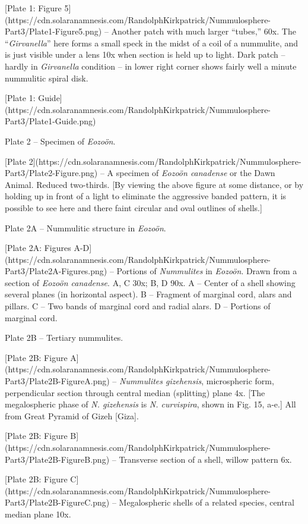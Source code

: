 \documentclass[a4paper, 12pt, oneside]{article}
\begin{document}
[Plate 1: Figure 5](https://cdn.solaranamnesis.com/RandolphKirkpatrick/Nummulosphere-Part3/Plate1-Figure5.png) -- Another patch with much larger ``tubes,'' 60x. The ``\emph{Girvanella}'' here forms a small speck in the midst of a coil of a nummulite, and is just visible under a lens 10x when section is held up to light. Dark patch -- hardly in \emph{Girvanella} condition -- in lower right corner shows fairly well a minute nummulitic spiral disk.

[Plate 1: Guide](https://cdn.solaranamnesis.com/RandolphKirkpatrick/Nummulosphere-Part3/Plate1-Guide.png)

Plate 2 -- Specimen of \emph{Eozoön}.

[Plate 2](https://cdn.solaranamnesis.com/RandolphKirkpatrick/Nummulosphere-Part3/Plate2-Figure.png) -- A specimen of \emph{Eozoön canadense} or the Dawn Animal. Reduced two-thirds. [By viewing the above figure at some distance, or by holding up in front of a light to eliminate the aggressive banded pattern, it is possible to see here and there faint circular and oval outlines of shells.]

Plate 2A -- Nummulitic structure in \emph{Eozoön}.

[Plate 2A: Figures A-D](https://cdn.solaranamnesis.com/RandolphKirkpatrick/Nummulosphere-Part3/Plate2A-Figures.png) -- Portions of \emph{Nummulites} in \emph{Eozoön}. Drawn from a section of \emph{Eozoön canadense}. A, C 30x; B, D 90x. A -- Center of a shell showing several planes (in horizontal aspect). B -- Fragment of marginal cord, alars and pillars. C -- Two bands of marginal cord and radial alars. D -- Portions of marginal cord.

Plate 2B -- Tertiary nummulites.

[Plate 2B: Figure A](https://cdn.solaranamnesis.com/RandolphKirkpatrick/Nummulosphere-Part3/Plate2B-FigureA.png) -- \emph{Nummulites gizehensis}, microspheric form, perpendicular section through central median (splitting) plane 4x. [The megalospheric phase of \emph{N. gizehensis} is \emph{N. curvispira}, shown in Fig. 15, a-e.] All from Great Pyramid of Gizeh [Giza].

[Plate 2B: Figure B](https://cdn.solaranamnesis.com/RandolphKirkpatrick/Nummulosphere-Part3/Plate2B-FigureB.png) -- Transverse section of a shell, willow pattern 6x.

[Plate 2B: Figure C](https://cdn.solaranamnesis.com/RandolphKirkpatrick/Nummulosphere-Part3/Plate2B-FigureC.png) -- Megalospheric shells of a related species, central median plane 10x.
\end{document}
